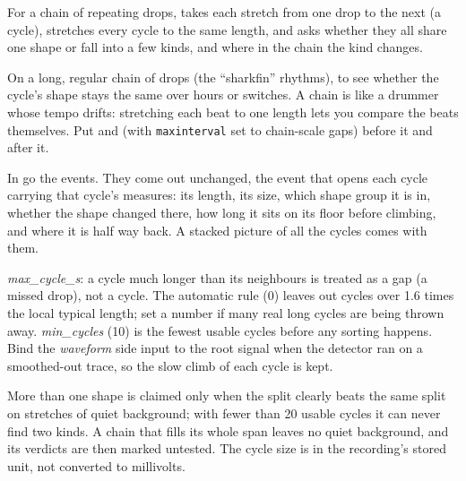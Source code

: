 For a chain of repeating drops, takes each stretch from one drop to the next (a cycle),
stretches every cycle to the same length, and asks whether they all share one shape or fall
into a few kinds, and where in the chain the kind changes.

On a long, regular chain of drops (the ``sharkfin'' rhythms), to see whether the cycle's
shape stays the same over hours or switches. A chain is like a drummer whose tempo drifts:
stretching each beat to one length lets you compare the beats themselves. Put
 and  (with
\texttt{maxinterval} set to chain-scale gaps) before it and
 after it.

In go the events. They come out unchanged, the event that opens each cycle carrying that
cycle's measures: its length, its size, which shape group it is in, whether the shape changed
there, how long it sits on its floor before climbing, and where it is half way back. A
stacked picture of all the cycles comes with them.

\emph{max\_cycle\_s}: a cycle much longer than its neighbours is treated as a gap (a missed
drop), not a cycle. The automatic rule (0) leaves out cycles over 1.6 times the local typical
length; set a number if many real long cycles are being thrown away. \emph{min\_cycles}
(10) is the fewest usable cycles before any sorting happens. Bind the \emph{waveform} side
input to the root signal when the detector ran on a smoothed-out trace, so the slow climb of
each cycle is kept.

More than one shape is claimed only when the split clearly beats the same split on stretches
of quiet background; with fewer than 20 usable cycles it can never find two kinds. A chain
that fills its whole span leaves no quiet background, and its verdicts are then marked
untested. The cycle size is in the recording's stored unit, not converted to millivolts.
